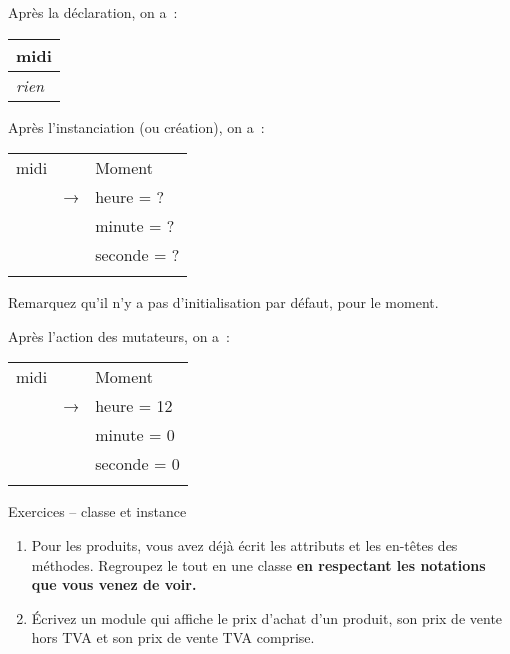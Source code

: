 		Après la déclaration, on a~:
		\begin{center}
		\begin{tabular}{m{2.2089999cm}}
		\centering\arraybslash  midi\\\hline
		\multicolumn{1}{|m{2.2089999cm}|}{\centering\arraybslash
		\itshape rien}\\\hline
		\end{tabular}
		\end{center}

		Après l'instanciation (ou création), on a~:
		\begin{center}
		\begin{tabular}{m{2.578cm}m{2.261cm}|m{3.162cm}|}
		\centering  midi &
		\multicolumn{1}{m{2.261cm}}{~
		} &
		\multicolumn{1}{m{3.162cm}}{\centering\arraybslash
		 Moment}\\\hhline{-~-}
		\multicolumn{1}{|m{2.578cm}|}{~
		} &
		\centering \sffamily → &
		\centering\arraybslash  heure = ?\\\hhline{-~~}
		~
		 &
		~
		 &
		\centering\arraybslash  minute = ?\\
		~
		 &
		~
		 &
		\centering\arraybslash  seconde = ?\\\hhline{~~-}
		\end{tabular}
		\end{center}
		
		Remarquez qu'il n'y a pas d'initialisation par défaut, pour le moment.

		Après l'action des mutateurs, on a~:
		\begin{center}
		\begin{tabular}{m{2.578cm}m{2.261cm}|m{3.162cm}|}
		\centering  midi &
		\multicolumn{1}{m{2.261cm}}{~
		} &
		\multicolumn{1}{m{3.162cm}}{\centering\arraybslash
		 Moment}\\\hhline{-~-}
		\multicolumn{1}{|m{2.578cm}|}{~
		} &
		\centering \sffamily → &
		\centering\arraybslash  heure = 12\\\hhline{-~~}
		~
		 &
		~
		 &
		\centering\arraybslash  minute = 0\\
		~
		 &
		~
		 &
		\centering\arraybslash  seconde = 0\\\hhline{~~-}
		\end{tabular}
		\end{center}

		\begin{Emphase}{Exercices – classe et instance}
			\remonter
			\begin{enumerate}
				\item 
					Pour les produits, vous avez déjà écrit les attributs et les en-têtes des
					méthodes. Regroupez le tout en une classe 
					\textbf{en respectant les notations que vous venez de voir.}
				\item 
					Écrivez un module qui affiche le prix d'achat d'un produit, son prix 
					de vente hors TVA et son prix de vente TVA comprise.
			\end{enumerate}		
		\end{Emphase}

